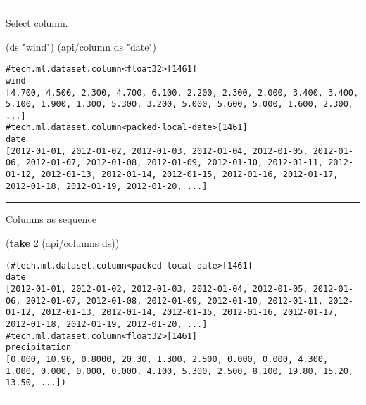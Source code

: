 \documentclass[]{article}
\newenvironment{Shaded}{\begin{snugshade}}{\end{snugshade}}
\newcommand{\KeywordTok}[1]{\textcolor[rgb]{0.13,0.29,0.53}{\textbf{#1}}}
\newcommand{\DecValTok}[1]{\textcolor[rgb]{0.00,0.00,0.81}{#1}}
\newcommand{\StringTok}[1]{\textcolor[rgb]{0.31,0.60,0.02}{#1}}
\newcommand{\NormalTok}[1]{#1}
\begin{document}
\begin{center}\rule{0.5\linewidth}{0.5pt}\end{center}

Select column.

\begin{Shaded}
\begin{Highlighting}[]
\NormalTok{(ds }\StringTok{"wind"}\NormalTok{)}
\NormalTok{(api/column ds }\StringTok{"date"}\NormalTok{)}
\end{Highlighting}
\end{Shaded}

\begin{verbatim}
#tech.ml.dataset.column<float32>[1461]
wind
[4.700, 4.500, 2.300, 4.700, 6.100, 2.200, 2.300, 2.000, 3.400, 3.400, 5.100, 1.900, 1.300, 5.300, 3.200, 5.000, 5.600, 5.000, 1.600, 2.300, ...]
#tech.ml.dataset.column<packed-local-date>[1461]
date
[2012-01-01, 2012-01-02, 2012-01-03, 2012-01-04, 2012-01-05, 2012-01-06, 2012-01-07, 2012-01-08, 2012-01-09, 2012-01-10, 2012-01-11, 2012-01-12, 2012-01-13, 2012-01-14, 2012-01-15, 2012-01-16, 2012-01-17, 2012-01-18, 2012-01-19, 2012-01-20, ...]
\end{verbatim}

\begin{center}\rule{0.5\linewidth}{0.5pt}\end{center}

Columns as sequence

\begin{Shaded}
\begin{Highlighting}[]
\NormalTok{(}\KeywordTok{take} \DecValTok{2}\NormalTok{ (api/columns ds))}
\end{Highlighting}
\end{Shaded}

\begin{verbatim}
(#tech.ml.dataset.column<packed-local-date>[1461]
date
[2012-01-01, 2012-01-02, 2012-01-03, 2012-01-04, 2012-01-05, 2012-01-06, 2012-01-07, 2012-01-08, 2012-01-09, 2012-01-10, 2012-01-11, 2012-01-12, 2012-01-13, 2012-01-14, 2012-01-15, 2012-01-16, 2012-01-17, 2012-01-18, 2012-01-19, 2012-01-20, ...] #tech.ml.dataset.column<float32>[1461]
precipitation
[0.000, 10.90, 0.8000, 20.30, 1.300, 2.500, 0.000, 0.000, 4.300, 1.000, 0.000, 0.000, 0.000, 4.100, 5.300, 2.500, 8.100, 19.80, 15.20, 13.50, ...])
\end{verbatim}

\begin{center}\rule{0.5\linewidth}{0.5pt}\end{center}
\end{document}
